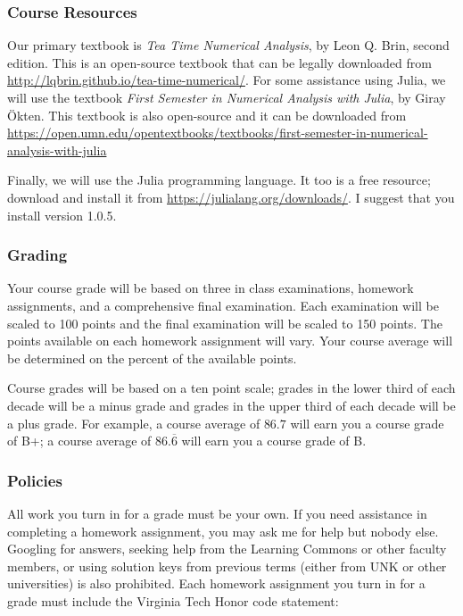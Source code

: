 \documentclass[12pt,fullpage]{article}
\newcounter{ex}\setcounter{ex}{0}
\begin{document}
\subsubsection*{Course Resources}

Our primary textbook is \emph{Tea Time Numerical Analysis}, by Leon Q. Brin, second edition.  This is an open-source textbook that can be legally downloaded from \url{http://lqbrin.github.io/tea-time-numerical/}. For
some assistance using Julia, we will use the textbook \emph{First Semester in Numerical Analysis with Julia}, by Giray \"Okten.  This textbook is also open-source and it  can be downloaded from 
\tiny  \url{https://open.umn.edu/opentextbooks/textbooks/first-semester-in-numerical-analysis-with-julia} \normalsize 


Finally, we will use the Julia programming language.  It too is a free resource; download and install it from \url{https://julialang.org/downloads/}.  I suggest that you install version 1.0.5.


\subsubsection*{Grading}

Your course grade will be based on three in class examinations, homework assignments, and a comprehensive final examination. Each
examination will be scaled to 100 points and the final examination will be scaled to 150 points.  The points available on each homework
assignment will vary.  Your course average will be determined on the percent of the available points.

Course grades will be based on a ten point scale; grades in the lower third of each decade will be a minus grade and grades in the
upper third of each decade will be a plus grade. For example, a course average of \(86.7\) will earn you a course grade of B+; a course average
of \(86.\overline{6}\) will earn you a course grade of B.

\subsubsection* {Policies}


All work you turn in for a grade must be your own.  If you need assistance in completing a homework assignment, you may ask me for help but nobody else. Googling for
answers, seeking help from the Learning Commons or other faculty members,  or using solution keys from previous terms (either from UNK or other universities) is also prohibited.  Each homework assignment you turn in for a grade must include the Virginia Tech Honor code statement:
\end{document}

